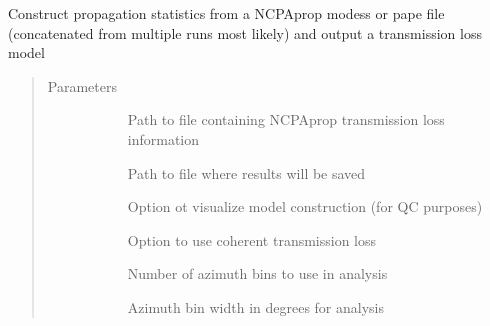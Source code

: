 \documentclass[letterpaper,10pt,english]{sphinxmanual}
\begin{document}
\begin{fulllineitems}
\begin{fulllineitems}
\label{\detokenize{stochprop.propagation:stochprop.propagation.TLossModel.build}}
Construct propagation statistics from a NCPAprop modess or pape file (concatenated from
multiple runs most likely) and output a transmission loss model
\begin{quote}\begin{description}
\item[{Parameters}] \leavevmode\begin{description}
\item[{}] \leavevmode
Path to file containing NCPAprop transmission loss information

\item[{}] \leavevmode
Path to file where results will be saved

\item[{}] \leavevmode
Option ot visualize model construction (for QC purposes)

\item[{}] \leavevmode
Option to use coherent transmission loss

\item[{}] \leavevmode
Number of azimuth bins to use in analysis

\item[{}] \leavevmode
Azimuth bin width in degrees for analysis

\end{description}

\end{description}\end{quote}

\end{fulllineitems}



\end{fulllineitems}
\end{document}
